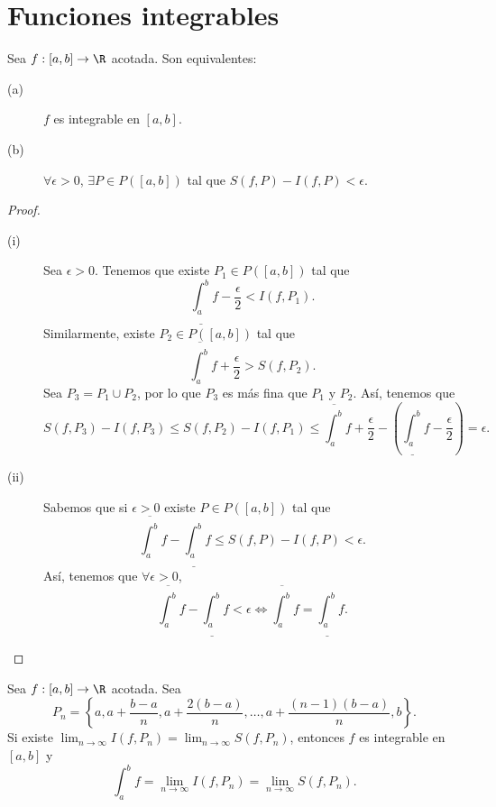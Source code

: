 \section{Funciones integrables}
\begin{ftheorem}
	\normalfont Sea $\displaystyle f : [a,b] \to \R$ acotada. Son equivalentes:
	\begin{description}
		\item[(a)] $\displaystyle f $ es integrable en $\displaystyle [a,b] $.
		\item[(b)] $\displaystyle \forall \epsilon > 0 $, $\displaystyle \exists P \in P\left([a,b]\right) $ tal que $\displaystyle S\left(f,P\right)-I\left(f,P\right) < \epsilon  $.
	\end{description}
\end{ftheorem}
\begin{proof}
\begin{description}
	\item[(i)] Sea $\displaystyle \epsilon > 0 $. Tenemos que existe $\displaystyle P_{1} \in P\left(\left[a,b\right] \right) $ tal que 
		\[ \underline{\int^{b}_{a}} f  - \frac{\epsilon }{2} < I\left(f,P_{1}\right) .\]
		Similarmente, existe $\displaystyle P_{2} \in P\left(\left[a,b\right] \right) $ tal que 
		\[ \overline{\int^{b}_{a}} f + \frac{\epsilon }{2} > S\left(f,P_{2}\right)  .\]
	Sea $\displaystyle P_{3} = P_{1} \cup P_{2} $, por lo que $\displaystyle P_{3} $ es más fina que $\displaystyle P_{1} $ y $\displaystyle P_{2} $. Así, tenemos que 
	\[ S\left(f,P_{3}\right)-I\left(f,P_{3}\right) \leq S\left(f,P_{2}\right)-I\left(f,P_{1}\right) \leq \overline{\int^{b}_{a}} f + \frac{\epsilon }{2} - \left(\underline{\int^{b}_{a}} f - \frac{\epsilon }{2}\right) = \epsilon   .\]
\item[(ii)] Sabemos que si $\displaystyle \epsilon > 0 $ existe $\displaystyle P \in P\left(\left[a,b\right] \right) $ tal que 
	\[ \overline{\int^{b}_{a}}  f - \underline{\int^{b}_{a}} f \leq S\left(f,P\right) - I\left(f,P\right) < \epsilon .\]
	Así, tenemos que $\displaystyle \forall \epsilon > 0 $,
	\[ \overline{\int^{b}_{a}} f -\underline{\int^{b}_{a}} f < \epsilon \iff \overline{\int^{b}_{a}} f = \underline{\int^{b}_{a}} f .\]
\end{description}
\end{proof}
\begin{fprop}[]
	\normalfont Sea $\displaystyle f : \left[a,b\right] \to \R $ acotada. Sea 
	\[ P_{n} = \left\{ a, a + \frac{b-a}{n}, a + \frac{2\left(b-a\right)}{n}, \ldots, a + \frac{\left(n-1\right)\left(b-a\right)}{n}, b\right\} .\]
	Si existe $\displaystyle \lim_{n \to \infty}I\left(f,P_{n}\right) = \lim_{n \to \infty}S\left(f,P_{n}\right) $, entonces $\displaystyle f $ es integrable en $\displaystyle [a,b] $ y 
	\[ \int^{b}_{a} f = \lim_{n \to \infty}I\left(f,P_{n}\right) = \lim_{n \to \infty}S\left(f,P_{n}\right) .\]
\end{fprop}
